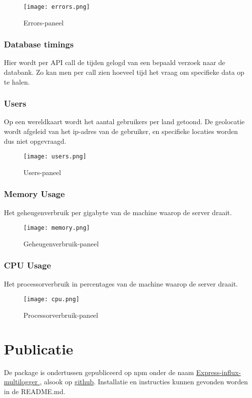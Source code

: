 \begin{figure}[h]
	\centering
	\texttt{[image: errors.png]}
	\caption{Errors-paneel}
	\label{fig:errors}
\end{figure}

\subsubsection{Database timings}
\label{sec:dbtimings}
Hier wordt per API call de tijden gelogd van een bepaald verzoek naar de databank. Zo kan men per call zien hoeveel tijd het vraag om specifieke data op te halen.


\subsubsection{Users}
\label{sec:users}
Op een wereldkaart wordt het aantal gebruikers per land getoond. De geolocatie wordt afgeleid van het ip-adres van de gebruiker, en specifieke locaties worden dus niet opgevraagd.

\begin{figure}[h]
	\centering
	\texttt{[image: users.png]}
	\caption{Users-paneel}
	\label{fig:users}
\end{figure}

\subsubsection{Memory Usage}
\label{sec:memory}
Het geheugenverbruik per gigabyte van de machine waarop de server draait.
\begin{figure}[h]
	\centering
	\texttt{[image: memory.png]}
	\caption{Geheugenverbruik-paneel}
	\label{fig:mem}
\end{figure}

\subsubsection{CPU Usage}
\label{sec:cpu}
Het processorverbruik in percentages van de machine waarop de server draait.

\begin{figure}[h]
	\centering
	\texttt{[image: cpu.png]}
	\caption{Processorverbruik-paneel}
	\label{fig:cpu}
\end{figure}

\section{Publicatie}
\label{sec:publication}

De package is ondertussen gepubliceerd op npm onder de naam \href{https://www.npmjs.com/package/express-influx-multilogger}{Express-influx-multilogger
}, alsook op \href{https://github.com/LeunensMichiel/express-influx-multilogger}{github}. Installatie en instructies kunnen gevonden worden in de README.md. 